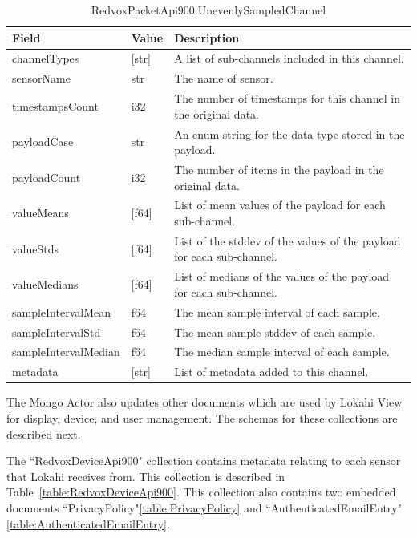 \begin{table}[H]
	\centering
	\caption{RedvoxPacketApi900.UnevenlySampledChannel}
	\begin{tabularx}{\textwidth}{llX}
		\toprule
		\textbf{Field} & \textbf{Value} & \textbf{Description} \\
		\midrule
		channelTypes & [str] & A list of sub-channels included in this channel. \\
		sensorName & str & The name of sensor. \\
		timestampsCount & i32 & The number of timestamps for this channel in the original data. \\
		payloadCase & str & An enum string for the data type stored in the payload. \\
		payloadCount & i32 & The number of items in the payload in the original data. \\
		valueMeans & [f64] & List of mean values of the payload for each sub-channel. \\
		valueStds & [f64] & List of the stddev of the values of the payload for each sub-channel. \\
		valueMedians & [f64] & List of medians of the values of the payload for each sub-channel. \\
		sampleIntervalMean & f64 & The mean sample interval of each sample. \\
		sampleIntervalStd & f64 & The mean sample stddev of each sample. \\
		sampleIntervalMedian & f64 & The median sample interval of each sample. \\
		metadata & [str] & List of metadata added to this channel. \\
		\bottomrule
	\end{tabularx}
	\label{table:UnevenlySampledChannel}
\end{table}

The Mongo Actor also updates other documents which are used by Lokahi View for display, device, and user management. The schemas for these collections are described next.

The ``RedvoxDeviceApi900" collection contains metadata relating to each sensor that Lokahi receives from. This collection is described in Table~\ref{table:RedvoxDeviceApi900}. This collection also contains two embedded documents ``PrivacyPolicy"\ref{table:PrivacyPolicy} and ``AuthenticatedEmailEntry"\ref{table:AuthenticatedEmailEntry}.

